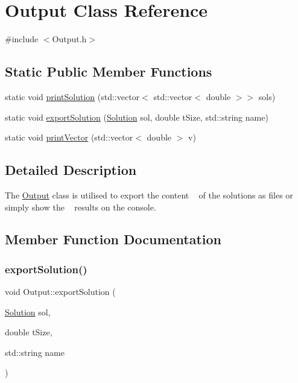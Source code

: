 \hypertarget{class_output}{}\section{Output Class Reference}
\label{class_output}


{\ttfamily \#include $<$Output.\+h$>$}

\subsection*{Static Public Member Functions}
\begin{DoxyCompactItemize}
\item 
static void \hyperlink{class_output_a79b3b86314e979457e5aac1ff4840605}{print\+Solution} (std\+::vector$<$ std\+::vector$<$ double $>$$>$ sols)
\item 
static void \hyperlink{class_output_a4bbefa0db72e03bed0d48c0277126aab}{export\+Solution} (\hyperlink{class_solution}{Solution} sol, double t\+Size, std\+::string name)
\item 
static void \hyperlink{class_output_a71ceb48aa64ba420138bc3be536a457d}{print\+Vector} (std\+::vector$<$ double $>$ v)
\end{DoxyCompactItemize}


\subsection{Detailed Description}
The \hyperlink{class_output}{Output} class is utilised to export the content ~\newline
 of the solutions as files or simply show the ~\newline
 results on the console. 

\subsection{Member Function Documentation}
\mbox{\label{class_output_a4bbefa0db72e03bed0d48c0277126aab}} 
\subsubsection{\texorpdfstring{export\+Solution()}{exportSolution()}}
{\footnotesize\ttfamily void Output\+::export\+Solution (\begin{DoxyParamCaption}\item[{\hyperlink{class_solution}{Solution}}]{sol,  }\item[{double}]{t\+Size,  }\item[{std\+::string}]{name }\end{DoxyParamCaption})\hspace{0.3cm}{\ttfamily [static]}}

